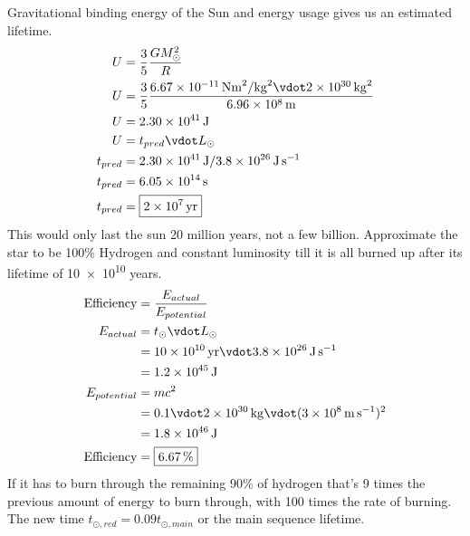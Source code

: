 \documentclass[newpage]{homework}
\begin{document}
\maketitle

\question
\begin{alphaparts}
    \questionpart Gravitational binding energy of the Sun and energy usage gives us an estimated lifetime.
        \begin{align*}
            U   &=	\frac{3}{5} \frac{GM_\odot^2}{R}	\\
            U   &=	\frac{3}{5} \frac{\SI{6.67e-11}{\newton\metre^2\per\kilogram^2} \vdot \SI{2e30}{\kilogram}^2}{\SI{6.96e8}{\metre}}	\\
            U   &=	\SI{2.30e41}{\joule}	\\
            U   &=  t_{pred} \vdot L_\odot \\
            t_{pred}    &=	\SI{2.30e41}{\joule} / \SI{3.8e26}{\joule\per\second}	\\
            t_{pred}    &=  \SI{6.05e14}{\second}   \\
            t_{pred}    &=	\boxed{\SI{2e7}{yr}}
        \end{align*}
        This would only last the sun 20 million years, not a few billion.
    \questionpart Approximate the star to be 100\% Hydrogen and constant luminosity till it is all burned up after its lifetime of \num{10e10} years.
        \begin{align*}
            \text{Efficiency}   &=	\frac{E_{actual}}{E_{potential}}	\\
            E_{actual}  &=  t_\odot \vdot L_\odot   \\
                        &=  \SI{10e10}{yr} \vdot \SI{3.8e26}{\joule\per\second}	\\
                        &=  \SI{1.2e45}{\joule}	\\
            E_{potential}   &=  mc^2    \\
                        &=  0.1 \vdot \SI{2e30}{\kilogram} \vdot (\SI{3e8}{\metre\per\second})^2    \\
                        &=  \SI{1.8e46}{\joule} \\
            \text{Efficiency}   &=  \boxed{\SI{6.67}{\percent}}
        \end{align*}
    \questionpart If it has to burn through the remaining 90\% of hydrogen that's 9 times the previous amount of energy to burn through, with 100 times the rate of burning. The new time $t_{\odot,red} = 0.09 t_{\odot,main}$ or  the main sequence lifetime.
\end{alphaparts}
\end{document}
